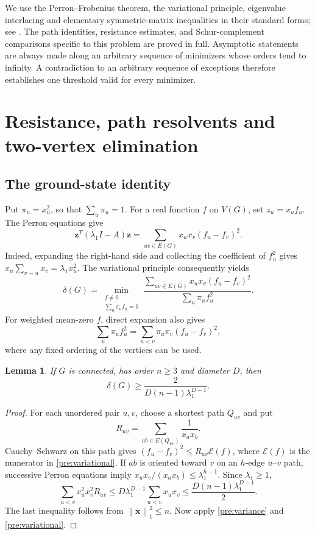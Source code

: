 \documentclass[11pt,a4paper]{article}
\numberwithin{equation}{section}
\newtheorem{lemma}[theorem]{Lemma}
\theoremstyle{definition}
\theoremstyle{remark}
\newcommand{\norm}[1]{\left\lVert#1\right\rVert}
\begin{document}
We use the Perron--Frobenius theorem, the variational principle, eigenvalue
interlacing and elementary symmetric-matrix inequalities in their standard
forms; see \citet{BrouwerHaemers2012}. The path identities, resistance
estimates, and Schur-complement comparisons specific to this problem are
proved in full. Asymptotic statements are always made along an arbitrary
sequence of minimizers whose orders tend to infinity. A contradiction to
an arbitrary sequence of exceptions therefore establishes one threshold
valid for every minimizer.

\section{Resistance, path resolvents and two-vertex elimination}
\label{sec:preliminaries}

\subsection{The ground-state identity}
Put $\pi_u=x_u^2$, so that $\sum_u\pi_u=1$. For a real function $f$ on
$V(G)$, set $z_u=x_uf_u$. The Perron equations give
\begin{equation}\label{pre:energy}
 \mathbf z^T(\lambda_1I-A)\mathbf z
 =\sum_{uv\in E(G)}x_ux_v(f_u-f_v)^2.
\end{equation}
Indeed, expanding the right-hand side and collecting the coefficient of
$f_u^2$ gives $x_u\sum_{v\sim u}x_v=\lambda_1x_u^2$.
The variational principle consequently yields
\begin{equation}\label{pre:variational}
 \delta(G)=\min_{\substack{f\ne0\\\sum_u\pi_uf_u=0}}
 \frac{\sum_{uv\in E(G)}x_ux_v(f_u-f_v)^2}
 {\sum_u\pi_uf_u^2}.
\end{equation}
For weighted mean-zero $f$, direct expansion also gives
\begin{equation}\label{pre:variance}
 \sum_u\pi_uf_u^2=\sum_{u<v}\pi_u\pi_v(f_u-f_v)^2,
\end{equation}
where any fixed ordering of the vertices can be used.

\begin{lemma}\label{pre:diameter}
If $G$ is connected, has order $n\ge3$ and diameter $D$, then
\[
 \delta(G)\ge\frac{2}{D(n-1)\lambda_1^{D-1}}.
\]
\end{lemma}
\begin{proof}
For each unordered pair $u,v$, choose a shortest path $Q_{uv}$ and put
\[
 R_{uv}=\sum_{ab\in E(Q_{uv})}\frac1{x_ax_b}.
\]
Cauchy--Schwarz on this path gives
$(f_u-f_v)^2\le R_{uv}\mathcal E(f)$, where $\mathcal E(f)$ is the
numerator in \eqref{pre:variational}. If $ab$ is oriented toward $v$ on
an $h$-edge $u$--$v$ path, successive Perron equations imply
$x_ux_v/(x_ax_b)\le\lambda_1^{h-1}$. Since $\lambda_1\ge1$,
\[
 \sum_{u<v}x_u^2x_v^2R_{uv}
 \le D\lambda_1^{D-1}\sum_{u<v}x_ux_v
 \le\frac{D(n-1)\lambda_1^{D-1}}2.
\]
The last inequality follows from $\norm{\mathbf x}_1^2\le n$.
Now apply \eqref{pre:variance} and \eqref{pre:variational}.
\end{proof}
\end{document}

